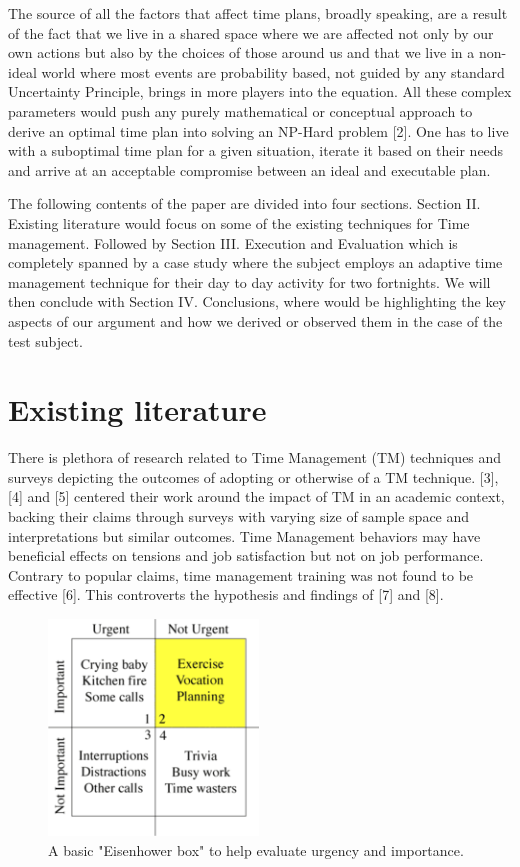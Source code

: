 \documentclass[conference]{IEEEtran}
\begin{document}
The source of all the factors that affect time plans, broadly speaking, are a result of the fact that we live in a shared space where we are affected not only by our own actions but also by the choices of those around us and that we live in a non-ideal world where most events are probability based, not guided by any standard Uncertainty Principle, brings in more players into the equation. All these complex parameters would push any purely mathematical or conceptual approach to derive an optimal time plan into solving an NP-Hard problem [2]. One has to live with a suboptimal time plan for a given situation, iterate it based on their needs and arrive at an acceptable compromise between an ideal and executable plan.

The following contents of the paper are divided into four sections. Section II. Existing literature would focus on some of the existing techniques for Time management. Followed by Section III. Execution and Evaluation which is completely spanned by a case study where the subject employs an adaptive time management technique for their day to day activity for two fortnights. We will then conclude with Section IV. Conclusions, where would be highlighting the key aspects of our argument and how we derived or observed them in the case of the test subject.

\section{Existing literature}
There is plethora of research related to Time Management (TM) techniques and surveys depicting the outcomes of adopting or otherwise of a TM technique. [3], [4] and [5] centered their work around the impact of TM in an academic context, backing their claims through surveys with varying size of sample space and interpretations but similar outcomes. Time Management behaviors may have beneficial effects on tensions and job satisfaction but not on job performance. Contrary to popular claims, time management training was not found to be effective [6]. This controverts the hypothesis and findings of [7] and [8].

\begin{figure}[hb]
  \centering
  \includegraphics[width=2.2in]{eisenhower}
  \caption[]
   {A basic "Eisenhower box" to help evaluate urgency and importance.}
\end{figure}
\end{document}

